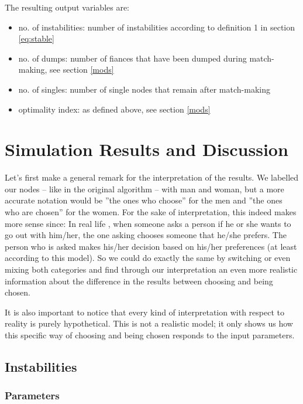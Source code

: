 \documentclass[11pt]{article}
\begin{document}
\noindent The resulting output variables are:

\begin{itemize}
  \item no. of instabilities: number of instabilities according to definition 1 in section \ref{eq:stable}
  \item no. of dumps: number of fiances that have been dumped during match-making, see section \ref{mods}
  \item no. of singles: number of single nodes that remain after match-making
  \item optimality index: as defined above, see section \ref{mods}
\end{itemize}

\section{Simulation Results and Discussion}

Let's first make a general remark for the interpretation of the results. We labelled our nodes -- like in 
the original algorithm -- with man and woman, but a more accurate notation would be ''the ones who 
choose'' for the men and ''the ones who are chosen'' for the women. For the sake of interpretation, 
this indeed makes more sense since: In real life , when someone asks a person if he or she wants to go out with him/her,
the one asking chooses someone that he/she prefers. The person who is asked makes his/her decision based on his/her preferences
(at least according to this model). So we could do exactly the same by switching or even mixing both categories and
find through our interpretation an even more realistic information about the difference in the results between choosing and being chosen.

It is also important to notice that every kind of interpretation with respect to reality is purely 
hypothetical. This is not a realistic model; it only shows us how this specific way of choosing and 
being chosen responds to the input parameters.
 

\subsection{Instabilities}

\subsubsection{Parameters}
\end{document}
